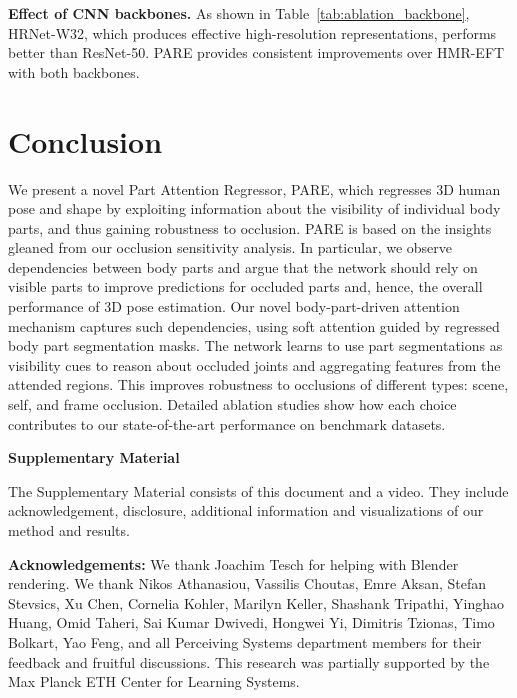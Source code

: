 \documentclass[10pt,twocolumn,letterpaper,usenames,dvipsnames]{article}
\newcommand{\methodname}{PARE\xspace}
\begin{document}
\noindent\textbf{Effect of  CNN backbones.} 
As shown in Table~\ref{tab:ablation_backbone}, HRNet-W32, which produces effective high-resolution representations, performs better than ResNet-50. PARE provides consistent improvements over HMR-EFT with both backbones.

%
 	\vspace{-1.5ex}
\section{Conclusion}\vspace{-1.5ex}
\label{conclusion}
We present a novel Part Attention Regressor, {\methodname}, which regresses 3D human pose and shape by exploiting information about the visibility  of individual body parts, and thus gaining robustness to occlusion. 
{\methodname} is based on the insights gleaned from our occlusion sensitivity analysis. 
In particular, we observe dependencies between body parts and argue that the network should rely on visible parts to improve predictions for occluded parts and, hence, the overall performance of 3D pose estimation.
Our novel body-part-driven attention mechanism captures such dependencies, using soft attention guided by regressed body part segmentation masks. 
The  network learns to use  part segmentations as visibility  cues  to  reason  about occluded joints and aggregating features from the attended regions. 
This improves  robustness  to  occlusions of different types:  scene, self, and frame occlusion.
Detailed ablation studies show how each choice contributes to our state-of-the-art performance on benchmark datasets.  

	{\small
		
		\balance
		
	}
	\newpage
\appendix
	{\noindent\Large\textbf{Supplementary Material}}
	\newline
	\setcounter{page}{1}
	
	The Supplementary Material consists of this document and a video. They include acknowledgement, disclosure, additional information and visualizations of our method and results.

\noindent
{\bf Acknowledgements:}
We thank Joachim Tesch for helping with Blender rendering. We thank Nikos Athanasiou, Vassilis Choutas, Emre Aksan, Stefan Stevsics, Xu Chen, Cornelia Kohler, Marilyn Keller, Shashank Tripathi, Yinghao Huang, Omid Taheri, Sai Kumar Dwivedi, Hongwei Yi, Dimitris Tzionas, Timo Bolkart, Yao Feng, and all Perceiving Systems department members for their feedback and fruitful discussions. This research was partially supported by the Max Planck ETH Center for Learning Systems.
\end{document}
